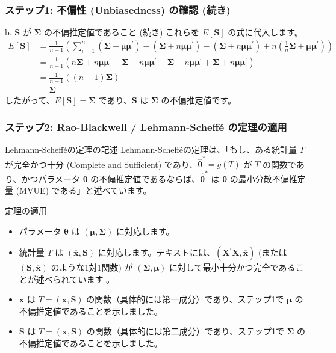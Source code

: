 \documentclass[aspectratio=169]{beamer}
\begin{document}
\begin{frame}
\frametitle{ステップ1: 不偏性 (Unbiasedness) の確認 (続き)}
\begin{block}{b. $\bm{S}$ が $\bm{\Sigma}$ の不偏推定値であること (続き)}
これらを $E[\bm{S}]$ の式に代入します。
\begin{align*}
E[\bm{S}] &= \frac{1}{n-1}\left(\sum_{i=1}^{n}(\bm{\Sigma}+\bm{\mu}\bm{\mu}^{\prime})-(\bm{\Sigma}+n\bm{\mu}\bm{\mu}^{\prime})-(\bm{\Sigma}+n\bm{\mu}\bm{\mu}^{\prime})+n(\frac{1}{n}\bm{\Sigma}+\bm{\mu}\bm{\mu}^{\prime})\right) \\
&= \frac{1}{n-1}\left(n\bm{\Sigma}+n\bm{\mu}\bm{\mu}^{\prime}-\bm{\Sigma}-n\bm{\mu}\bm{\mu}^{\prime}-\bm{\Sigma}-n\bm{\mu}\bm{\mu}^{\prime}+\bm{\Sigma}+n\bm{\mu}\bm{\mu}^{\prime}\right) \\
&= \frac{1}{n-1}((n-1)\bm{\Sigma}) \\
&= \bm{\Sigma}
\end{align*}
したがって、$E[\bm{S}]=\bm{\Sigma}$ であり、$\bm{S}$ は $\bm{\Sigma}$ の不偏推定値です。
\end{block}
\end{frame}

\begin{frame}
\frametitle{ステップ2: Rao-Blackwell / Lehmann-Scheffé の定理の適用}
\begin{block}{Lehmann-Schefféの定理の記述}
Lehmann-Schefféの定理は、「もし、ある統計量 $T$ が完全かつ十分 (Complete and Sufficient) であり、$\hat{\bm{\theta}}^* = g(T)$ が $T$ の関数であり、かつパラメータ $\bm{\theta}$ の不偏推定値であるならば、$\hat{\bm{\theta}}^*$ は $\bm{\theta}$ の最小分散不偏推定量 (MVUE) である」と述べています。
\end{block}
\begin{block}{定理の適用}
\begin{itemize}
    \item パラメータ $\bm{\theta}$ は $(\bm{\mu},\bm{\Sigma})$ に対応します。
    \item 統計量 $T$ は $(\overline{\bm{x}},\bm{S})$ に対応します。テキストには、$(\bm{X}^{\prime}\bm{X},\overline{\bm{x}})$ (または $(\bm{S},\overline{\bm{x}})$ のような1対1関数) が $(\bm{\Sigma},\bm{\mu})$ に対して最小十分かつ完全であることが述べられています  。
    \item $\overline{\bm{x}}$ は $T=(\overline{\bm{x}},\bm{S})$ の関数（具体的には第一成分）であり、ステップ1で $\bm{\mu}$ の不偏推定値であることを示しました。
    \item $\bm{S}$ は $T=(\overline{\bm{x}},\bm{S})$ の関数（具体的には第二成分）であり、ステップ1で $\bm{\Sigma}$ の不偏推定値であることを示しました。
\end{itemize}
\end{block}
\end{frame}
\end{document}
